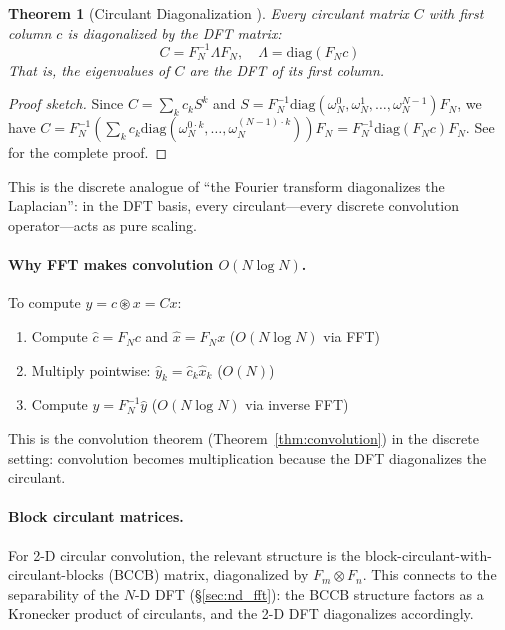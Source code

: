 \documentclass[12pt,a4paper]{report}
\theoremstyle{thms}
\newtheorem{theorem}{Theorem}[section]
\theoremstyle{defns}
\begin{document}
\begin{theorem}[Circulant Diagonalization \cite{davis_circulant}]
    Every circulant matrix $C$ with first column $c$ is diagonalized by the DFT matrix:
    \begin{equation}
        C = F_N^{-1} \Lambda F_N, \quad \Lambda = \mathrm{diag}(F_N c)
        \label{eq:circulant_diag}
    \end{equation}
    That is, the eigenvalues of $C$ are the DFT of its first column.
    \label{thm:circulant}
\end{theorem}

\begin{proof}[Proof sketch]
    Since $C = \sum_{k} c_k S^k$ and $S = F_N^{-1}\mathrm{diag}(\omega_N^0, \omega_N^1, \ldots, \omega_N^{N-1})F_N$, we have $C = F_N^{-1}(\sum_k c_k \mathrm{diag}(\omega_N^{0\cdot k}, \ldots, \omega_N^{(N-1)\cdot k}))F_N = F_N^{-1}\mathrm{diag}(F_N c)F_N$. See \cite{davis_circulant, bassett_circulant} for the complete proof.
\end{proof}

This is the discrete analogue of ``the Fourier transform diagonalizes the Laplacian'': in the DFT basis, every circulant—every discrete convolution operator—acts as pure scaling.

\paragraph{Why FFT makes convolution $O(N \log N)$.} To compute $y = c \circledast x = Cx$:
\begin{enumerate}
    \item Compute $\hat{c} = F_N c$ and $\hat{x} = F_N x$ \hfill ($O(N \log N)$ via FFT)
    \item Multiply pointwise: $\hat{y}_k = \hat{c}_k \hat{x}_k$ \hfill ($O(N)$)
    \item Compute $y = F_N^{-1}\hat{y}$ \hfill ($O(N \log N)$ via inverse FFT)
\end{enumerate}
This is the convolution theorem (Theorem~\ref{thm:convolution}) in the discrete setting: convolution becomes multiplication because the DFT diagonalizes the circulant.

\paragraph{Block circulant matrices.} For 2-D circular convolution, the relevant structure is the block-circulant-with-circulant-blocks (BCCB) matrix, diagonalized by $F_m \otimes F_n$. This connects to the separability of the $N$-D DFT (\S\ref{sec:nd_fft}): the BCCB structure factors as a Kronecker product of circulants, and the 2-D DFT diagonalizes accordingly.
\end{document}
